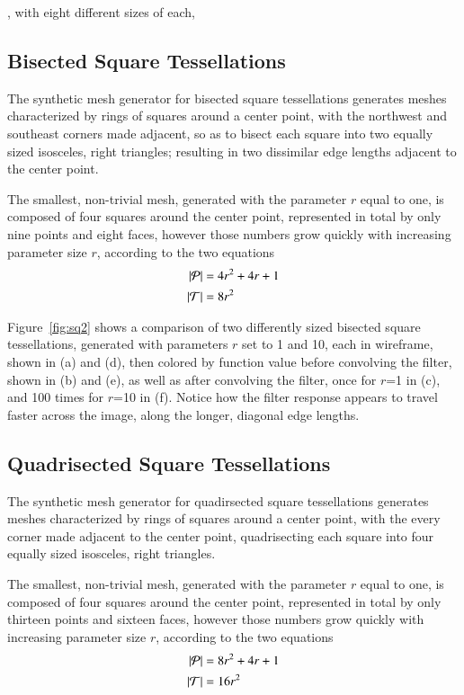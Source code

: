 , with eight different sizes of each,

%
%
%
%
\pagebreak
\subsection{Bisected Square Tessellations}
The synthetic mesh generator for bisected square tessellations generates meshes characterized by rings of squares around a center point, with the northwest and southeast corners made adjacent, so as to bisect each square into two equally sized isosceles, right triangles; resulting in two dissimilar edge lengths adjacent to the center point.

The smallest, non-trivial mesh, generated with the parameter $r$ equal to one, is composed of four squares around the center point, represented in total by only nine points and eight faces, however those numbers grow quickly with increasing parameter size $r$, according to the two equations
\begin{align}
	|\mathcal{P}| &= 4r^2 + 4r + 1 \\
	|\mathcal{T}| &= 8r^2
	\label{eq:sq2PointAndFaceCounts}
\end{align}

Figure~\ref{fig:sq2} shows a comparison of two differently sized bisected square tessellations, generated with parameters $r$ set to 1 and 10, each in wireframe, shown in (a) and (d), then colored by function value before convolving the filter, shown in (b) and (e), as well as after convolving the filter, once for $r$=1 in (c), and 100 times for $r$=10 in (f). Notice how the filter response appears to travel faster across the image, along the longer, diagonal edge lengths.%

%

%
%
%
%
\pagebreak
\subsection{Quadrisected Square Tessellations}
The synthetic mesh generator for quadirsected square tessellations generates meshes characterized by rings of squares around a center point, with the every corner made adjacent to the center point, quadrisecting each square into four equally sized isosceles, right triangles.

The smallest, non-trivial mesh, generated with the parameter $r$ equal to one, is composed of four squares around the center point, represented in total by only thirteen points and sixteen faces, however those numbers grow quickly with increasing parameter size $r$, according to the two equations
\begin{align}
	|\mathcal{P}| &= 8r^2 + 4r + 1 \\
	|\mathcal{T}| &= 16r^2
	\label{eq:sq4PointAndFaceCounts}
\end{align}

